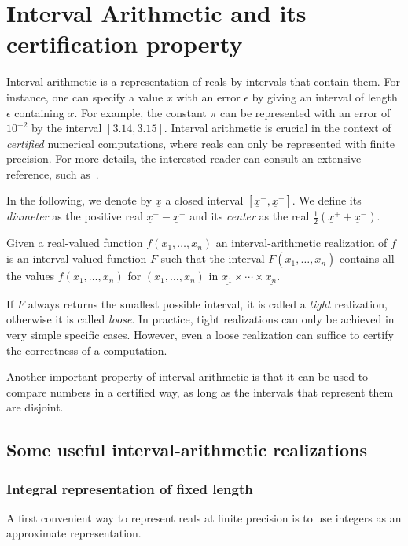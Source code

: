 \documentclass{amsart}
\newcommand{\inter}[1]{\underline{#1}}
\theoremstyle{definition}
\begin{document}
\section{Interval Arithmetic and its certification property}
Interval arithmetic is a representation of reals by intervals that
contain them.  For instance, one can specify a value $x$
with an error $\epsilon$ by giving an interval of length $\epsilon$
containing $x$.  For example, the constant
$\pi$ can be represented with an error of~$10^{-2}$ by the interval
$[3.14, 3.15]$. Interval arithmetic is crucial in the context of
\emph{certified} numerical computations, where reals can only be
represented with finite precision. For more details, the interested
reader can consult an extensive reference, such
as~\cite{InterBook}.\medskip

In the following, we denote
by $\inter{x}$ a closed interval $[\inter{x}^-, \inter{x}^+]$.
We define its \emph{diameter} as the 
positive real $\inter{x}^+ - \inter{x}^-$ and its \emph{center} as the real 
$\frac{1}{2}(\inter{x}^+ + \inter{x}^-)$. 

Given a real-valued function $f(x_1,\ldots,x_n)$ an
interval-arithmetic realization of $f$ is an interval-valued function
$F$ such that the interval $F(\inter{x_1}, \ldots, \inter{x_n})$
contains all the values $f(x_1,\ldots,x_n)$ for $(x_1,\ldots,x_n)$ in
$\inter{x_1}\times \cdots \times \inter{x_n}$.

If $F$ always returns the smallest possible interval, it is called a
\emph{tight} realization, otherwise it is called \emph{loose}. In
practice, tight realizations can only be achieved in very simple
specific cases. However, even a loose realization can suffice to
certify the correctness of a computation.

Another important property of interval arithmetic is that it can be
used to compare numbers in a certified way, as long as the intervals
that represent them are disjoint.

\subsection{Some useful interval-arithmetic realizations}
\subsubsection{Integral representation of fixed length}
\label{sec:intgral_representation}
A first convenient way to represent reals at finite precision is to
use integers as an approximate representation.
\end{document}
